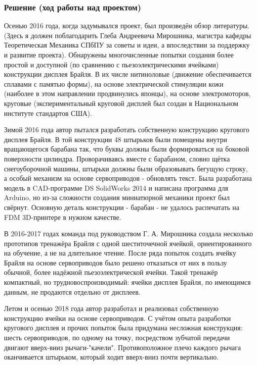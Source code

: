 \documentclass[a4paper,12pt]{article} %
\begin{document}
\subsubsection{Решение (ход работы над проектом)}
Осенью 2016 года, когда задумывался проект, был произведён обзор литературы.
(Здесь я должен поблагодарить Глеба Андреевича Мирошника, магистра кафедры Теоретическая Механика СПбПУ за советы и идеи, а впоследствии за поддержку и развитие проекта). Обнаружены многочисленные попытки создания более простой и доступной (по сравнению с пьезоэлектрическими ячейками) конструкции дисплея Брайля. В их числе нитиноловые (движение обеспечивается сплавами с памятью формы), на основе электрической стимуляции кожи (наиболее в этом направлении продвинулись японцы), на основе электромоторов, круговые (экспериментальный круговой дисплей был создан в Национальном институте стандартов США). 

Зимой 2016 года автор пытался разработать собственную конструкцию кругового дисплея Брайля. В той конструкции 48 штырьков были помещены внутри вращающегося барабана так, что буквы должны были формироваться на боковой поверхности цилиндра. Проворачиваясь вместе с барабаном, словно щётка снегоуборочной машины, штырьки должны были образовывать бегущую строку, а особый механизм на основе сервоприводов - обновлять текст.  Была разработана модель в CAD-программе DS SolidWorks 2014 и написана программа для Arduino, но из-за сложности создания миниатюрной механики проект был свёрнут. Основную деталь конструкции - барабан - не удалось распечатать на FDM 3D-принтере в нужном качестве.

В 2016-2017 годах команда под руководством Г. А. Мирошника создала несколько прототипов тренажёра Брайля  с одной шеститочечной ячейкой, ориентированного на обучение, а не на длительное чтение. После ряда попыток создать ячейку Брайля на основе сервоприводов было решено отказаться от них в пользу обычной, более надёжной пьезоэлектрической ячейки. Такой тренажёр компактный, но трудновоспроизводимый: ячейки дисплея Брайля, по имеющимся данным, не продаются отдельно от дисплеев.

Летом и осенью 2018 года автор разработал и реализовал собственную конструкцию ячейки на основе сервоприводов. С учётом опыта разработки кругового дисплея и прочих попыток была придумана несложная конструкция: шесть сервоприводов, по одному на точку, посредством зубчатой передачи двигают вверх-вниз рычаги-"качели". Противоположное плечо каждого рычага оканчивается штырьком, который ходит вверх-вниз почти вертикально.
\end{document}
